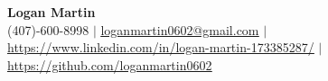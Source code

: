 \documentclass[letterpaper,11pt]{article}
\begin{document}
\begin{center}
    \textbf{\Huge Logan Martin} \\ \vspace{1pt}
		\small (407)-600-8998 $|$
    \small \href{mailto:loganmartin0602@gmail.com}{\underline{loganmartin0602@gmail.com}} $|$ 
    \href{https://www.linkedin.com/in/logan-martin-173385287/}{\underline{https://www.linkedin.com/in/logan-martin-173385287/}} $|$
    \href{https://github.com/loganmartin0602}{\underline{https://github.com/loganmartin0602}}
\end{center}


%



\end{document}
